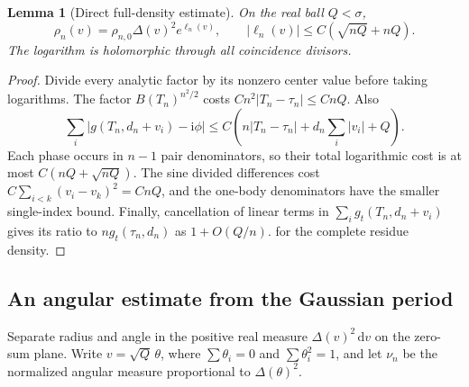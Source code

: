 \documentclass[11pt]{article}
\numberwithin{equation}{section}
\newtheorem{lemma}[theorem]{Lemma}
\theoremstyle{definition}
\newcommand{\dd}{\,\mathrm d}
\newcommand{\ii}{\mathrm i}
\begin{document}
\begin{lemma}[Direct full-density estimate]\label{lem:rc-density}
On the real ball $Q<\sigma$,
\begin{equation}\label{eq:rc-density-log}
 \rho_n(v)=\rho_{n,0}\Delta(v)^2e^{\ell_n(v)},\qquad
 |\ell_n(v)|\le C(\sqrt{nQ}+nQ).
\end{equation}
The logarithm is holomorphic through all coincidence divisors.
\end{lemma}
\begin{proof}
Divide every analytic factor by its nonzero center value before
taking logarithms.  The factor $B(T_n)^{n^2/2}$ costs
$Cn^2|T_n-\tau_n|\le CnQ$.  Also
\[
 \sum_i|g(T_n,d_n+v_i)-\ii\phi|
 \le C\left(n|T_n-\tau_n|+d_n\sum_i|v_i|+Q\right).
\]
Each phase occurs in $n-1$ pair denominators, so their total
logarithmic cost is at most $C(nQ+\sqrt{nQ})$.
The sine divided differences cost
$C\sum_{i<k}(v_i-v_k)^2=CnQ$, and the one-body denominators have
the smaller single-index bound.  Finally, cancellation of linear
terms in $\sum_i g_t(T_n,d_n+v_i)$ gives its ratio to
$ng_t(\tau_n,d_n)$ as $1+O(Q/n)$.
for the complete residue density.
\end{proof}

\subsection{An angular estimate from the Gaussian period}

Separate radius and angle in the positive real measure
$\Delta(v)^2\dd v$ on the zero-sum plane.  Write
$v=\sqrt Q\,\theta$, where $\sum\theta_i=0$ and
$\sum\theta_i^2=1$, and let $\nu_n$ be the normalized angular
measure proportional to $\Delta(\theta)^2$.
\end{document}
